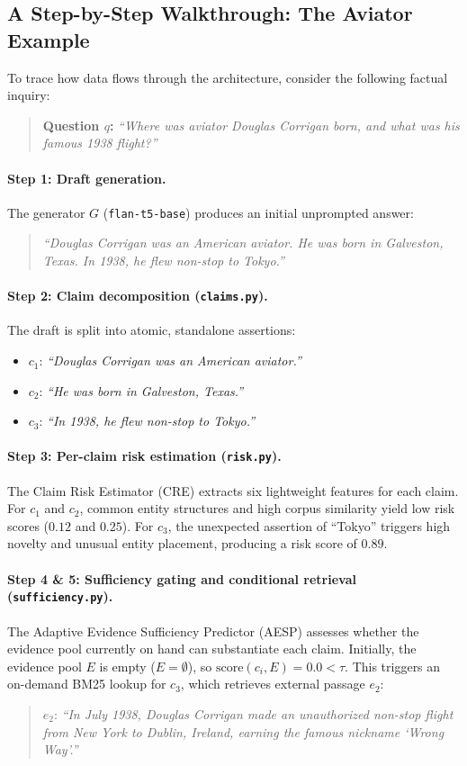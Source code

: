 \subsection{A Step-by-Step Walkthrough: The Aviator Example}
To trace how data flows through the architecture, consider the following factual inquiry:
\begin{quote}
  \textbf{Question $q$:} \emph{``Where was aviator Douglas Corrigan born, and what was his famous 1938 flight?''}
\end{quote}

\paragraph{Step 1: Draft generation.}
The generator $G$ (\texttt{flan-t5-base}) produces an initial unprompted answer:
\begin{quote}
  \emph{``Douglas Corrigan was an American aviator. He was born in Galveston, Texas. In 1938, he flew non-stop to Tokyo.''}
\end{quote}

\paragraph{Step 2: Claim decomposition (\texttt{claims.py}).}
The draft is split into atomic, standalone assertions:
\begin{itemize}
  \item $c_1$: \emph{``Douglas Corrigan was an American aviator.''}
  \item $c_2$: \emph{``He was born in Galveston, Texas.''}
  \item $c_3$: \emph{``In 1938, he flew non-stop to Tokyo.''}
\end{itemize}

\paragraph{Step 3: Per-claim risk estimation (\texttt{risk.py}).}
The Claim Risk Estimator (CRE) extracts six lightweight features for each claim. For $c_1$ and $c_2$, common entity structures and high corpus similarity yield low risk scores ($0.12$ and $0.25$). For $c_3$, the unexpected assertion of ``Tokyo'' triggers high novelty and unusual entity placement, producing a risk score of $0.89$.

\paragraph{Step 4 \& 5: Sufficiency gating and conditional retrieval (\texttt{sufficiency.py}).}
The Adaptive Evidence Sufficiency Predictor (AESP) assesses whether the evidence pool currently on hand can substantiate each claim. Initially, the evidence pool $E$ is empty ($E = \emptyset$), so $\mathrm{score}(c_i, E) = 0.0 < \tau$. This triggers an on-demand BM25 lookup for $c_3$, which retrieves external passage $e_2$:
\begin{quote}
  $e_2$: \emph{``In July 1938, Douglas Corrigan made an unauthorized non-stop flight from New York to Dublin, Ireland, earning the famous nickname `Wrong Way'.''}
\end{quote}

